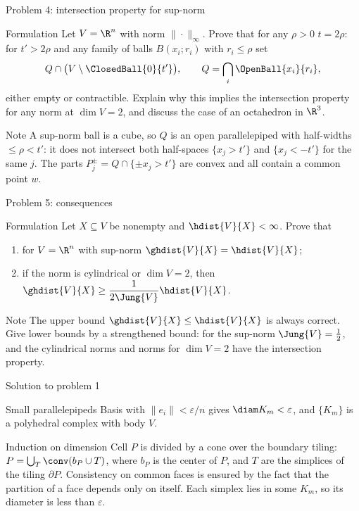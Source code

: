 \documentclass[aspectratio=169,11pt]{beamer}
\begin{document}
\begin{frame}{Problem \textup{4}: intersection property for sup-norm}
\begin{block}{Formulation}
Let $V = \R^n$ with norm $\|\cdot\|_\infty$. Prove that for any $\rho > 0$ $t = 2\rho$\textup{:} for $t' > 2\rho$ and any family of balls $B(x_i;r_i)$ with $r_i \le \rho$ set
\[
Q \cap \bigl(V \setminus \ClosedBall{0}{t'}\bigr), \qquad Q = \bigcap_i \OpenBall{x_i}{r_i},
\]
either empty or contractible. Explain why this implies the intersection property for any norm at $\dim V = 2$, and discuss the case of an octahedron in $\R^3$.
\end{block}
\begin{block}{Note}
A sup-norm ball is a cube, so $Q$ is an open parallelepiped with half-widths $\le \rho < t'$\textup{:} it does not intersect both half-spaces $\{x_j > t'\}$ and $\{x_j < -t'\}$ for the same $j$. The parts $P_j^{\pm} = Q \cap \{\pm x_j > t'\}$ are convex and all contain a common point $w$.
\end{block}
\end{frame}

\begin{frame}{Problem \textup{5}: consequences}
\begin{block}{Formulation}
Let $X \subseteq V$ be nonempty and $\hdist{V}{X} < \infty$. Prove that
\begin{enumerate}
\item[(a)] for $V = \R^n$ with sup-norm $\ghdist{V}{X} = \hdist{V}{X}$\textup{;}
\item[(b)] if the norm is cylindrical or $\dim V = 2$, then $\ghdist{V}{X} \ge \dfrac{1}{2\Jung{V}} \hdist{V}{X}$.
\end{enumerate}
\end{block}
\begin{block}{Note}
The upper bound $\ghdist{V}{X} \le \hdist{V}{X}$ is always correct. Give lower bounds by a strengthened bound\textup{:} for the sup-norm $\Jung{V} = \frac12$, and the cylindrical norms and norms for $\dim V = 2$ have the intersection property.
\end{block}
\end{frame}

\begin{frame}{Solution to problem \textup{1}}
\begin{block}{Small parallelepipeds}
Basis with $\|e_i\| < \varepsilon/n$ gives $\diam K_m < \varepsilon$, and $\{K_m\}$ is a polyhedral complex with body $V$.
\end{block}
\begin{block}{Induction on dimension}
Cell $P$ is divided by a cone over the boundary tiling\textup{:} $P = \bigcup_T \conv(b_P \cup T)$, where $b_P$ is the center of $P$, and $T$ are the simplices of the tiling $\partial P$. Consistency on common faces is ensured by the fact that the partition of a face depends only on itself. Each simplex lies in some $K_m$, so its diameter is less than $\varepsilon$.
\end{block}
\end{frame}
\end{document}
